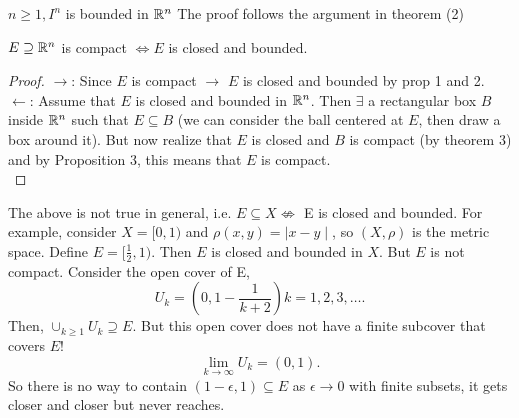 \documentclass[a4paper]{article}
\begin{document}
\begin{theorem}
  $n \geq 1, I^n$ is bounded in $\mathbb{R}^n$
  The proof follows the argument in theorem (2) 
\end{theorem}

\begin{theorem}
$E \supseteq \mathbb{R}^n$ is compact $\iff E$ is closed and bounded.
\begin{proof}
   $\rightarrow$: Since $E$ is compact  $\to$  $E$ is closed and bounded by prop 1 and 2. \\

   $\leftarrow$: Assume that $E$ is closed and bounded in  $\mathbb{R}^n$. Then $\exists $ a rectangular box $B$ 
    inside $\mathbb{R}^n$ such that $E \subseteq B$ (we can consider the ball centered at $E$, then draw a box around it).
    But now realize that $E$ is closed and  $B$ is compact (by theorem 3) and by Proposition 3, this means that
    $E$ is compact. \\
\end{proof}
\end{theorem}

\begin{note}
  The above is not true in general, i.e. $E \subseteq X \not\iff$ E is closed and bounded. For example, consider
  $X = [0,1)$ and  $\rho(x,y) = \mid x-y\mid $, so $(X, \rho)$ is the metric space. Define  $E= [\frac{1}{2},1)$.
  Then $E$ is closed and bounded  in $ X$. But $E$ is not compact. Consider the open cover of E,
   \[
   U_k = \left( 0, 1 - \frac{1}{k+2} \right)  k = 1,2,3,\ldots 
   .\]
   Then, $\cup_{k \geq 1} U_k \supseteq E$. But this open cover does not have a finite subcover that covers $E$!
   \[
   \lim_{k \to \infty} U_k = \left( 0, 1 \right) 
   .\] 
   So there is no way to contain $\left( 1 - \epsilon,1 \right) \subseteq E$ as $\epsilon \to 0$ with finite subsets, it gets
   closer and closer but never reaches. 
\end{note}
\end{document}
